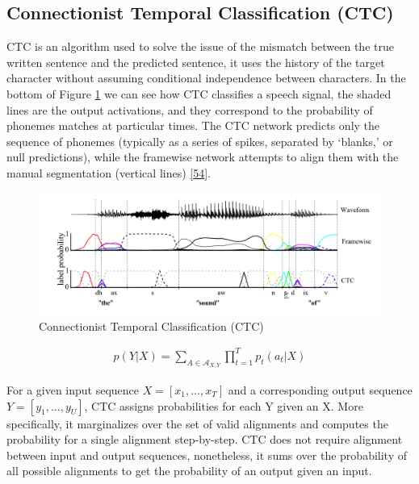 \documentclass[
  a4paper,
]{article}
\begin{document}
\hypertarget{connectionist-temporal-classification-ctc}{%
\subsection{Connectionist Temporal Classification
(CTC)}\label{connectionist-temporal-classification-ctc}}

CTC is an algorithm used to solve the issue of the mismatch between the
true written sentence and the predicted sentence, it uses the history of
the target character without assuming conditional independence between
characters. In the bottom of Figure \ref{fig:ctc} we can see how CTC
classifies a speech signal, the shaded lines are the output activations,
and they correspond to the probability of phonemes matches at particular
times. The CTC network predicts only the sequence of phonemes (typically
as a series of spikes, separated by `blanks,' or null predictions),
while the framewise network attempts to align them with the manual
segmentation (vertical lines)
\protect\hyperlink{ref-inproceedingsctc}{{[}54{]}}.

\begin{figure}

{\centering \includegraphics{ctc} 

}

\caption{Connectionist Temporal Classification (CTC)}\label{fig:ctc}
\end{figure}

\begin{align}
p(Y|X) = \sum_{A \in \mathcal{A}_{X,Y}} \prod_{t=1}^T p_t(a_t|X)
\end{align}

For a given input sequence \(X = [x_1, ..., x_T]\) and a corresponding
output sequence \(Y = [y_1, ..., y_U]\), CTC assigns probabilities for
each Y given an X. More specifically, it marginalizes over the set of
valid alignments and computes the probability for a single alignment
step-by-step. CTC does not require alignment between input and output
sequences, nonetheless, it sums over the probability of all possible
alignments to get the probability of an output given an input.
\end{document}
